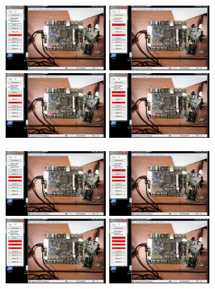 \documentclass[a4paper]{article}
\begin{document}
\begin{figure}[H]
    \includegraphics[width=0.335\textwidth, angle=90]{02_79}
    \hfill
    \includegraphics[width=0.335\textwidth, angle=90]{02_80}
    \hfill
    \includegraphics[width=0.335\textwidth, angle=90]{02_81}
    \hfill
    \includegraphics[width=0.335\textwidth, angle=90]{02_82}
    \vspace{0.15cm}

    \includegraphics[width=0.335\textwidth, angle=90]{02_83}
    \hfill
    \includegraphics[width=0.335\textwidth, angle=90]{02_84}
    \hfill
    \includegraphics[width=0.335\textwidth, angle=90]{02_85}
    \hfill
    \includegraphics[width=0.335\textwidth, angle=90]{02_86}
    

\end{figure}
\end{document}
